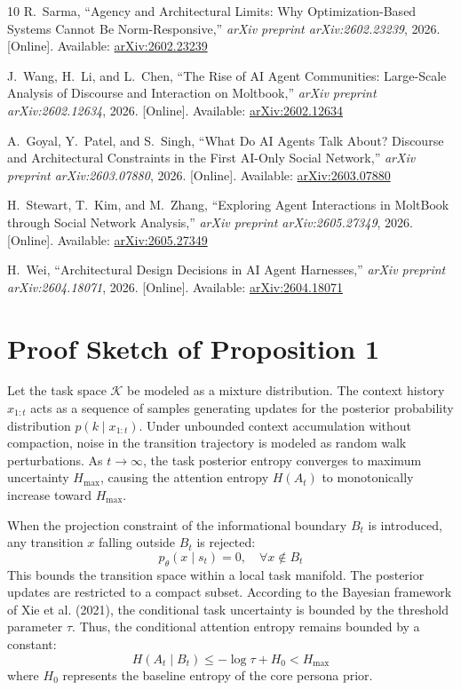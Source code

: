 \documentclass[10pt,journal,compsoc]{IEEEtran}
\begin{document}
\begin{thebibliography}{10}
R.~Sarma, ``Agency and Architectural Limits: Why Optimization-Based Systems Cannot Be Norm-Responsive,'' {\em arXiv preprint arXiv:2602.23239}, 2026. [Online]. Available: \href{https://arxiv.org/abs/2602.23239}{arXiv:2602.23239}

J.~Wang, H.~Li, and L.~Chen, ``The Rise of AI Agent Communities: Large-Scale Analysis of Discourse and Interaction on Moltbook,'' {\em arXiv preprint arXiv:2602.12634}, 2026. [Online]. Available: \href{https://arxiv.org/abs/2602.12634}{arXiv:2602.12634}

A.~Goyal, Y.~Patel, and S.~Singh, ``What Do AI Agents Talk About? Discourse and Architectural Constraints in the First AI-Only Social Network,'' {\em arXiv preprint arXiv:2603.07880}, 2026. [Online]. Available: \href{https://arxiv.org/abs/2603.07880}{arXiv:2603.07880}

H.~Stewart, T.~Kim, and M.~Zhang, ``Exploring Agent Interactions in MoltBook through Social Network Analysis,'' {\em arXiv preprint arXiv:2605.27349}, 2026. [Online]. Available: \href{https://arxiv.org/abs/2605.27349}{arXiv:2605.27349}

H.~Wei, ``Architectural Design Decisions in AI Agent Harnesses,'' {\em arXiv preprint arXiv:2604.18071}, 2026. [Online]. Available: \href{https://arxiv.org/abs/2604.18071}{arXiv:2604.18071}

\end{thebibliography}

\appendices
\section{Proof Sketch of Proposition 1}
Let the task space $\mathcal{K}$ be modeled as a mixture distribution. The context history $x_{1:t}$ acts as a sequence of samples generating updates for the posterior probability distribution $p(k \mid x_{1:t})$. Under unbounded context accumulation without compaction, noise in the transition trajectory is modeled as random walk perturbations. As $t \to \infty$, the task posterior entropy converges to maximum uncertainty $H_{\max}$, causing the attention entropy $H(A_t)$ to monotonically increase toward $H_{\max}$.

When the projection constraint of the informational boundary $B_t$ is introduced, any transition $x$ falling outside $B_t$ is rejected:
\begin{equation}
p_\theta(x \mid s_t) = 0, \quad \forall x \notin B_t
\end{equation}
This bounds the transition space within a local task manifold. The posterior updates are restricted to a compact subset. According to the Bayesian framework of Xie et al. (2021), the conditional task uncertainty is bounded by the threshold parameter $\tau$. Thus, the conditional attention entropy remains bounded by a constant:
\begin{equation}
H(A_t \mid B_t) \le -\log \tau + H_0 < H_{\max}
\end{equation}
where $H_0$ represents the baseline entropy of the core persona prior.
\end{document}
